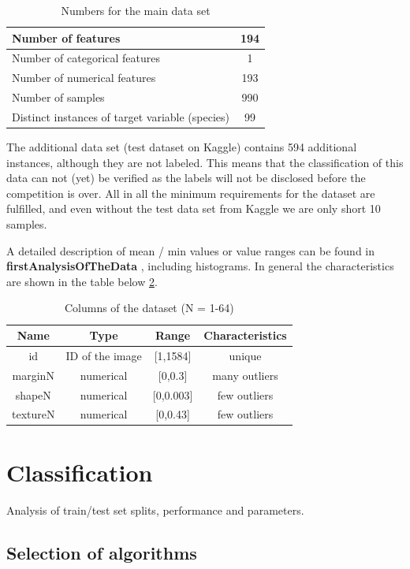 \documentclass{sig-alternate-05-2015}
\begin{document}
\begin{table}[h]
\centering
\caption{Numbers for the main data set}
\label{tbl:numbers}
\begin{tabular}{|l|c|}
\hline 
Number of features & 194 \\ 
\hline 
Number of categorical features & 1 \\ 
\hline 
Number of numerical features & 193 \\ 
\hline 
Number of samples & 990  \\ 
\hline 
Distinct instances of target variable (species) & 99 \\ 
\hline 
\end{tabular}
\end{table}

The additional data set (test dataset on Kaggle) contains 594 additional instances, although they are not labeled.
This means that the classification of this data can not (yet) be verified as the labels will not be disclosed before the competition is over.
All in all the minimum requirements for the dataset are fulfilled, and even without the test data set from Kaggle we are only short 10 samples.


A detailed description of mean / min values or value ranges can be found in 
\textbf{firstAnalysisOfTheData}
, including histograms.
In general the characteristics are shown in the table below \ref{tbl:columns}.

\begin{table}[h]
\centering
\caption{Columns of the dataset (N = 1-64)}
\label{tbl:columns}
\begin{tabular}{|c|c|c|c|}
\hline 
Name & Type & Range & Characteristics \\ 
\hline 
id & ID of the image & [1,1584] & unique \\ 
\hline 
marginN & numerical & [0,0.3] & many outliers \\ 
\hline 
shapeN & numerical & [0,0.003] & few outliers \\ 
\hline 
textureN & numerical & [0,0.43] & few outliers \\ 
\hline 
\end{tabular} 
\end{table}

\section{Classification}
Analysis of train/test set splits, performance and parameters.

\subsection{Selection of algorithms}
\end{document}

